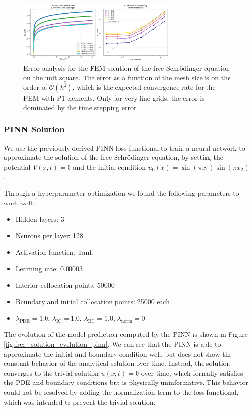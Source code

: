\documentclass{article}
\theoremstyle{definition}
\theoremstyle{plain}
\theoremstyle{remark}
\begin{document}
\begin{figure}[h!]
  \centering
  \includegraphics[width=0.7\textwidth, trim=19cm 0cm 0cm 0cm, clip]{figures/2d_error_analysis.png}
  \caption{Error analysis for the FEM solution of the free Schrödinger equation on the unit square. The error as a function of the mesh size is on the order of $\mathcal{O}(h^2)$, which is the expected convergence rate for the FEM with P1 elements. Only for very fine grids, the error is dominated by the time stepping error.}
  \label{fig:2d_error_analysis_2}
\end{figure}

\subsubsection*{PINN Solution}

We use the previously derived PINN loss functional to train a neural network to approximate the solution of the free Schrödinger equation, by setting the potential \( V(x,t) = 0 \) and the initial condition \( u_0(x) = \sin(\pi x_1)\sin(\pi x_2) \).

Through a hyperparameter optimization we found the following parameters to work well:

\begin{itemize}
  \item Hidden layers: 3
  \item Neurons per layer: 128
  \item Activation function: Tanh
  \item Learning rate: 0.00003
  \item Interior collocation points: 50000
  \item Boundary and initial collocation points: 25000 each
  \item $\lambda_{\mathrm{PDE}} = 1.0$, $\lambda_{\mathrm{IC}} = 1.0$, $\lambda_{\mathrm{BC}} = 1.0$, $\lambda_{\mathrm{norm}} = 0$
\end{itemize}

The evolution of the model prediction computed by the PINN is shown in Figure \ref{fig:free_solution_evolution_pinn}.
We can see that the PINN is able to approximate the initial and boundary condition well, but does not show the constant behavior of the analytical solution over time.
Instead, the solution converges to the trivial solution \( u(x,t) = 0 \) over time, which formally satisfies the PDE and boundary conditions but is physically uninformative.
This behavior could not be resolved by adding the normalization term to the loss functional, which was intended to prevent the trivial solution.
\end{document}
